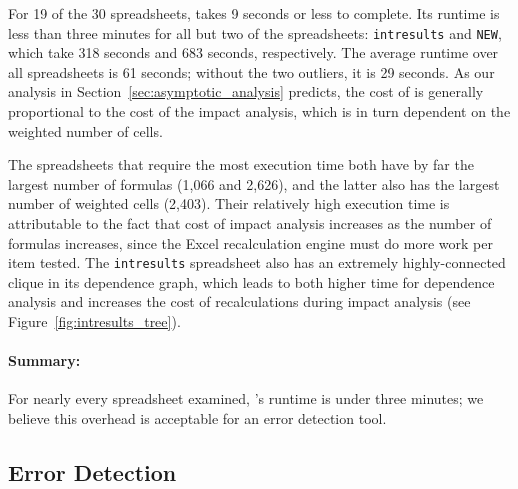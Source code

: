 For 19 of the 30 spreadsheets, \checkcell{} takes 9 seconds or less to
complete. Its runtime is less than three minutes for all but two of
the spreadsheets: \texttt{intresults} and \texttt{NEW}, which take 318
seconds and 683 seconds, respectively. The average runtime over all
spreadsheets is 61 seconds; without the two outliers, it is 29
seconds. As our analysis in Section~\ref{sec:asymptotic_analysis}
predicts, the cost of \checkcell{} is generally proportional to the
cost of the impact analysis, which is in turn dependent on the
weighted number of cells.

The spreadsheets that require the most execution time both have by far
the largest number of formulas (1,066 and 2,626), and the latter also
has the largest number of weighted cells (2,403). Their relatively
high execution time is attributable to the fact that cost of impact
analysis increases as the number of formulas increases, since the
Excel recalculation engine must do more work per item tested. The
\texttt{intresults} spreadsheet also has an extremely highly-connected
clique in its dependence graph, which leads to both higher time for
dependence analysis and increases the cost of recalculations during
impact analysis (see Figure~\ref{fig:intresults_tree}).

\paragraph{Summary:} For nearly every spreadsheet
 examined, \checkcell{}'s runtime is under three minutes; we believe
 this overhead is acceptable for an error detection tool.





\subsection{Error Detection}
\label{sec:user_study}

